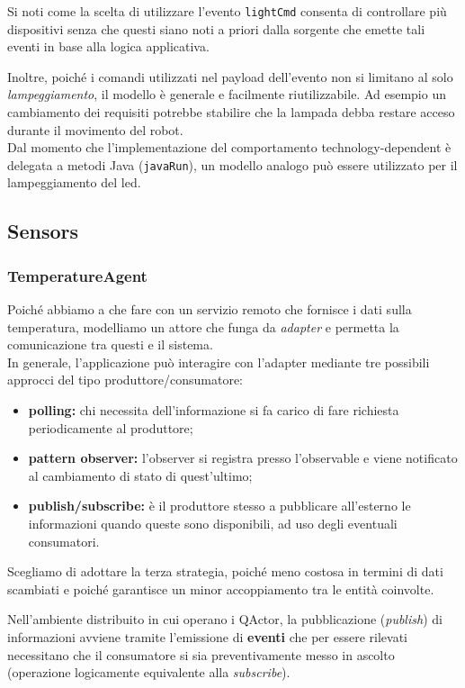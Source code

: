 \documentclass{../llncs}
\newcommand{\codescript}[1]{{\mbox{\small{\texttt{#1}}}}\xspace}
\begin{document}
Si noti come la scelta di utilizzare l'evento \codescript{lightCmd} consenta di controllare più dispositivi senza che questi siano noti a priori dalla sorgente che emette tali eventi in base alla logica applicativa.

Inoltre, poiché i comandi utilizzati nel payload dell'evento non si limitano al solo \textit{lampeggiamento}, il modello è generale e facilmente riutilizzabile. Ad esempio un cambiamento dei requisiti potrebbe stabilire che la lampada debba restare acceso durante il movimento del robot.\\

Dal momento che l'implementazione del comportamento technology-dependent è delegata a metodi Java (\codescript{javaRun}), un modello analogo può essere utilizzato per il lampeggiamento del led.

\subsection{Sensors}

\subsubsection{TemperatureAgent}
Poiché abbiamo a che fare con un servizio remoto che fornisce i dati sulla temperatura, modelliamo un attore che funga da \emph{adapter} e permetta la comunicazione tra questi e il sistema.\\

In generale, l'applicazione può interagire con l'adapter mediante tre possibili approcci del tipo produttore/consumatore:
\begin{itemize}
\item \textbf{polling:} chi necessita dell'informazione si fa carico di fare richiesta periodicamente al produttore;
\item \textbf{pattern observer:} l'observer si registra presso l'observable e viene notificato al cambiamento di stato di quest'ultimo;
\item \textbf{publish/subscribe:} è il produttore stesso a pubblicare all'esterno le informazioni quando queste sono disponibili, ad uso degli eventuali consumatori.
\end{itemize}
Scegliamo di adottare la terza strategia, poiché meno costosa in termini di dati scambiati e poiché garantisce un minor accoppiamento tra le entità coinvolte.

Nell'ambiente distribuito in cui operano i QActor, la pubblicazione (\textit{publish}) di informazioni avviene tramite l'emissione di \textbf{eventi} che per essere rilevati necessitano che il consumatore si sia preventivamente messo in ascolto (operazione logicamente equivalente alla \textit{subscribe}).\\
\end{document}

